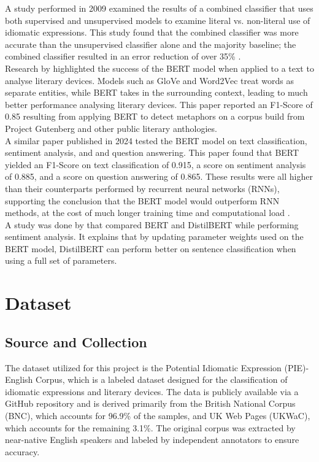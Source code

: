 \documentclass[11pt]{article}
\begin{document}
A study performed in 2009 examined the results of a combined classifier that uses both supervised and unsupervised models to examine literal vs. non-literal use of idiomatic expressions. This study found that the combined classifier was more accurate than the unsupervised classifier alone and the majority baseline; the combined classifier resulted in an error reduction of over 35\% \cite{li-sporleder-2009-classifier}. \\

Research by \citet{11251805} highlighted the success of the BERT model when applied to a text to analyse literary devices. Models such as GloVe and Word2Vec treat words as separate entities, while BERT takes in the surrounding context, leading to much better performance analysing literary devices. This paper reported an F1-Score of 0.85 resulting from applying BERT to detect metaphors on a corpus build from Project Gutenberg and other public literary anthologies. \\

A similar paper published in 2024 tested the BERT model on text classification, sentiment analysis, and and question answering. This paper found that BERT yielded an F1-Score on text classification of 0.915, a score on sentiment analysis of 0.885, and a score on question answering of 0.865. These results were all higher than their counterparts performed by recurrent neural networks (RNNs), supporting the conclusion that the BERT model would outperform RNN methods, at the cost of much longer training time and computational load \cite{10918499}. \\

A study was done by \citet{wu2024researchapplicationdeeplearningbased} that compared BERT and DistilBERT while performing sentiment analysis. It explains that by updating parameter weights used on the BERT model, DistilBERT can perform better on sentence classification when using a full set of parameters. \\

\section{Dataset}

\subsection{Source and Collection}
The dataset utilized for this project is the Potential Idiomatic Expression (PIE)-English Corpus, which is a labeled dataset designed for the classification of idiomatic expressions and literary devices. The data is publicly available via a GitHub repository and is derived primarily from the British National Corpus (BNC), which accounts for 96.9\% of the samples, and UK Web Pages (UKWaC), which accounts for the remaining 3.1\%. The original corpus was extracted by near-native English speakers and labeled by independent annotators to ensure accuracy. 
\end{document}
